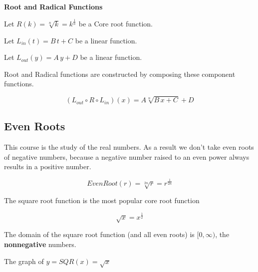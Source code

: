 \documentclass{ximera}
\begin{document}
\begin{definition} \textbf{\textcolor{green!50!black}{Root and Radical Functions}}


Let $R(k) = \sqrt[n]{k} =  k^{\tfrac{1}{n}} $ be a Core root function.

Let $L_{in}(t) = B \, t + C$ be a linear function.

Let $L_{out}(y) = A \, y + D$ be a linear function.


Root and Radical functions are constructed by composing these component functions.


\[
(L_{out} \circ R \circ L_{in})(x) = A \sqrt[n]{B \,x + C} + D
\]




\end{definition}






























\subsection*{Even Roots}

This course is the study of the real numbers. As a result we don't take even roots of negative numbers, because a negative number raised to an even power always results in a positive number.



\[   EvenRoot(r) = \sqrt[2n]{r} = r^{\tfrac{1}{2n}}          \]

The square root function is the most popular core root function


\[   \sqrt{x} = x^{\tfrac{1}{2}}          \]



The domain of the square root function (and all even roots) is $[0, \infty)$, the \textbf{nonnegative} numbers.  






The graph of $y = SQR(x) = \sqrt{x}$
\end{document}
